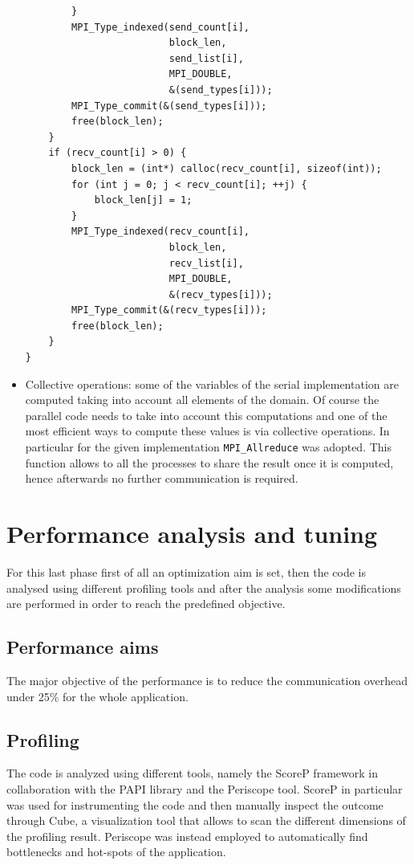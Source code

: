 \documentclass[12pt, a4paper]{article}
\begin{document}
\begin{itemize}
\begin{verbatim}
        }
        MPI_Type_indexed(send_count[i], 
                         block_len, 
                         send_list[i], 
                         MPI_DOUBLE,
                         &(send_types[i]));
        MPI_Type_commit(&(send_types[i]));
        free(block_len);
    }
    if (recv_count[i] > 0) {
        block_len = (int*) calloc(recv_count[i], sizeof(int));
        for (int j = 0; j < recv_count[i]; ++j) {
            block_len[j] = 1;
        }
        MPI_Type_indexed(recv_count[i],
                         block_len,
                         recv_list[i],
                         MPI_DOUBLE,
                         &(recv_types[i]));
        MPI_Type_commit(&(recv_types[i]));
        free(block_len);
    }
}
          \end{verbatim}
    \item Collective operations: some of the variables of the serial
          implementation are computed taking into account all elements of the
          domain. Of course the parallel code needs to take into account this
          computations and one of the most efficient ways to compute these
          values is via collective operations. In particular for the given
          implementation \verb=MPI_Allreduce=  was adopted. This
          function allows to all the processes to share the result once it is
          computed, hence afterwards no further communication is required.
  \end{itemize}

\clearpage

\section{Performance analysis and tuning}
For this last phase first of all an optimization aim is set, then the code is
analysed using different profiling tools and after the analysis some
modifications are performed in order to reach the predefined objective.

\subsection*{Performance aims}
The major objective of the performance is to reduce the communication overhead
under 25\% for the whole application. 

\subsection*{Profiling}
The code is analyzed using different tools, namely the ScoreP framework in 
collaboration with the PAPI library and the Periscope tool.
ScoreP in particular was used for instrumenting the code and then manually
inspect the outcome through Cube, a visualization tool that allows to scan the
different dimensions of the profiling result.
Periscope was instead employed to automatically find bottlenecks and hot-spots
of the application.
\end{document}
